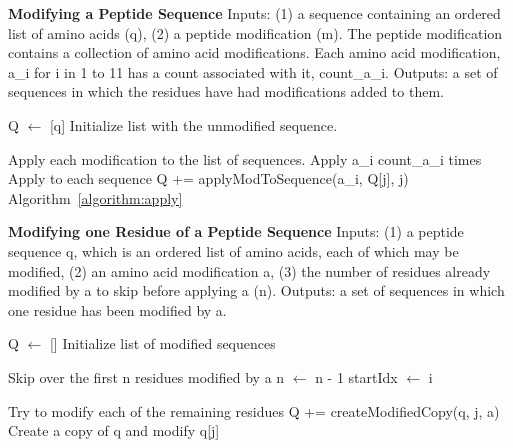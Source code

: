 \documentclass[12pt]{article}
\begin{document}
\begin{algorithm}
\caption{{\bf Modifying a Peptide Sequence} Inputs: (1) a sequence
  containing an ordered list of amino acids (q), (2) a peptide
  modification (m).  The peptide modification contains a collection of 
  amino acid modifications.  Each amino acid modification, a\_i for i
  in 1 to 11 has a count associated with it, count\_a\_i.  Outputs: a
  set of sequences in which the residues have had modifications added
  to them. 
  \label{algorithm:generate}}

\begin{algorithmic}[1]

  \State Q $\gets$ [q]
  \Comment Initialize list with the unmodified sequence.

  \Comment Apply each modification to the list of sequences.
    \Comment Apply a\_i count\_a\_i times 
      \Comment Apply to each sequence
        \State Q += applyModToSequence(a\_i, Q[j], j)
        \Comment Algorithm~\ref{algorithm:apply}
      \EndFor
    \EndFor
  \EndFor

  \State {}

\EndProcedure
\end{algorithmic}
\end{algorithm}

\begin{algorithm}
\caption{{\bf Modifying one Residue of a Peptide Sequence} Inputs: (1)
  a peptide sequence q, which is an ordered list of amino acids, each of which
  may be modified, (2) an amino acid modification a,  (3) the number
  of residues already modified by a to skip before applying a
  (n). Outputs: a set of sequences in which one residue has been
  modified by a.
  \label{algorithm:apply}} 
\begin{algorithmic}[1]

  \State Q $\gets$ []
  \Comment Initialize list of modified sequences

  \Comment Skip over the first n residues modified by a
      \State n $\gets$ n - 1
    \EndIf
      \State startIdx $\gets$ i
    \EndIf
  \EndFor

  \Comment Try to modify each of the remaining residues
      \State Q += createModifiedCopy(q, j, a)
      \Comment Create a copy of q and modify q[j]
    \EndIf
  \EndFor

  \State {}

\EndProcedure
\end{algorithmic}
\end{algorithm}
\end{document}
